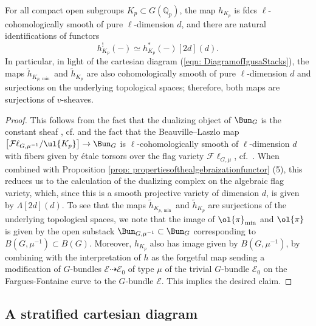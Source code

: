 \documentclass[letterpaper,11pt]{amsart}
\begin{document}
\begin{lemma}{\label{lemma: smoothnessofvertmaps}}
For all compact open subgroups $K_{p} \subset G(\mathbb{Q}_{p})$, the map $h_{K_{p}}$  is fdcs $\ell$-cohomologically smooth of pure $\ell$-dimension $d$, and there are natural identifications of functors
\[ h^{!}_{K_{p}}(-) \simeq h^{*}_{K_{p}}(-)[2d](d). \]
In particular, in light of the cartesian diagram (\ref{eqn: DiagramofIgusaStacks}), the maps $\tilde{h}_{K_{p,\min}}$ and $\tilde{h}_{K_{p}}$ are also cohomologically smooth of pure $\ell$-dimension $d$ and surjections on the underlying topological spaces; therefore, both maps are surjections of $v$-sheaves.
\end{lemma}
\begin{proof}
This follows from the fact that the dualizing object of $\Bun_{G}$ is the constant sheaf \cite[Proposition 1.1]{HamannImai}, cf. \cite[Lemma 5.1.8]{DvHKZ2} and the fact that the Beauville--Laszlo map $\left[\mathcal{F}\ell_{G,\mu^{-1}}/\ul{K_{p}}\right]\to \Bun_G$ is $\ell$-cohomologically smooth of $\ell$-dimension $d$ with fibers given by \'etale torsors over the flag variety $\mathcal{F}\ell_{G,\mu}$, cf.~\cite[Proof of Theorem IV.1.19]{FSGeomLLC}. When combined with Proposition \ref{prop: propertiesofthealgebraizationfunctor} (5), this reduces us to the calculation of the dualizing complex on the algebraic flag variety, which, since this is a smooth projective variety of dimension $d$, is given by $\Lambda[2d](d)$. To see that the maps $\tilde{h}_{K_{p,\min}}$ and $\tilde{h}_{K_{p}}$ are surjections of the underlying topological spaces, we note that the image of $\ol{\pi}_{\min}$ and $\ol{\pi}$ is given by the open substack $\Bun_{G,\mu^{-1}} \subset \Bun_{G}$ corresponding to $B(G,\mu^{-1}) \subset B(G)$. Moreover, $h_{K_{p}}$ also has image given by $B(G,\mu^{-1})$, by combining \cite[Proposition~A.9]{RapAppendixtoPadicCohomology} with the interpretation of $h$ as the forgetful map sending a modification of $G$-bundles $\mathcal{E} \dashrightarrow \mathcal{E}_{0}$ of type $\mu$ of the trivial $G$-bundle $\mathcal{E}_{0}$ on the Fargues-Fontaine curve to the $G$-bundle $\mathcal{E}$. This implies the desired claim.
\end{proof}

\subsection{A stratified cartesian diagram}\label{sec: Stratified}
\end{document}
